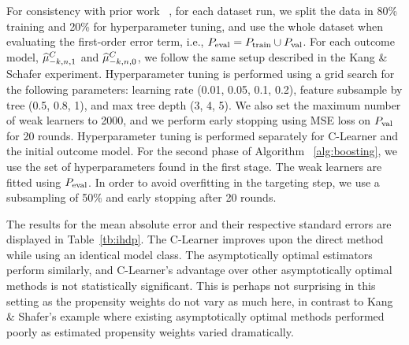 For consistency with prior work ~\cite{van2006targeted,chernozhukov2022riesznet,shi2019adapting},
for each dataset run, we split the data in 80\% training and 20\% for hyperparameter tuning, and use the whole dataset when evaluating the first-order error term, i.e.,  $P_{\rm eval} = P_{\rm train} \cup P_{\rm val}$. For each outcome model, $\widehat{\mu}_{-k, n, 1}^C$ and $\widehat{\mu}_{-k, n, 0}^C$, we follow the same setup described in the Kang \& Schafer experiment. Hyperparameter tuning is performed using a grid search for the following parameters: learning rate (0.01, 0.05, 0.1, 0.2), feature subsample by tree (0.5, 0.8, 1), and max tree depth (3, 4, 5). We also set the maximum number of weak learners to 2000, and we perform early stopping using MSE loss on $P_{\rm val}$ for 20 rounds. Hyperparameter tuning is performed separately for C-Learner and the initial outcome model. For the second phase of Algorithm ~\ref{alg:boosting}, we use the set of hyperparameters found in the first stage. The weak learners are fitted using $P_{\rm eval}$. In order to avoid overfitting in the targeting step, we use a subsampling of 50\% and early stopping after 20 rounds.



 The results for the mean absolute error and their respective standard errors are displayed in Table~\ref{tb:ihdp}. %
The C-Learner improves upon the direct method while using an identical model class.
The asymptotically optimal estimators perform similarly, and C-Learner's advantage over other asymptotically optimal methods is not statistically significant. This is perhaps not surprising in this setting as the propensity weights do not vary as much here, in contrast to Kang \& Shafer's example where existing asymptotically optimal methods performed poorly as estimated propensity weights varied dramatically. 

